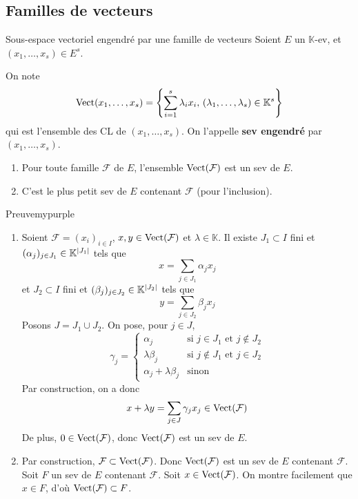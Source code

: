\subsection{Familles de vecteurs}

    \begin{defitheo}{Sous-espace vectoriel engendré par une famille de vecteurs}{}
        Soient $E$ un $\mathbb{K}$-ev, et $(x_1,\ldots,x_s) \in E^s$.

        On note 
        \[ \operatorname{Vect}(x_1,\ldots,x_s) = \left\{ \sum\limits_{i=1}^s \lambda_i x_i, \, (\lambda_1,\ldots,\lambda_s) \in \mathbb{K}^s \right\} \] 
        qui est l’ensemble des CL de $(x_1,\ldots,x_s)$. On l’appelle \textbf{sev engendré} par $(x_1,\ldots,x_s)$.

        \begin{enumerate}
            \item Pour toute famille $\mathcal{F}$ de $E$, l’ensemble $\operatorname{Vect}(\mathcal{F})$ est un sev de $E$.
            \item C’est le plus petit sev de $E$ contenant $\mathcal{F}$ (pour l’inclusion).
        \end{enumerate}
    \end{defitheo}

    \begin{demo}{Preuve}{mypurple}
        \begin{enumerate}
        \item Soient $\mathcal{F} = (x_i)_{i \in I}$, $x,y \in \operatorname{Vect}(\mathcal{F})$ et $\lambda \in \mathbb{K}$. Il existe $J_1 \subset I$ fini et $(\alpha_j)_{j \in J_1} \in \mathbb{K}^{\left\lvert J_1\right\rvert}$ tels que 
        \[ x = \sum_{j \in J_1} \alpha_j x_j \]
        et $J_2 \subset I$ fini et $(\beta_j)_{j \in J_2} \in \mathbb{K}^{\left\lvert J_2\right\rvert}$ tels que 
        \[ y = \sum_{j \in J_2} \beta_j x_j \]
        Posons $J = J_1 \cup J_2$. On pose, pour $j \in J$,
        \[ \gamma_j = \left\{ 
            \begin{array}{cl}
                \alpha_j & \text{si } j \in J_1 \text{ et } j \notin J_2 \\
                \lambda \beta_j & \text{si } j \notin J_1 \text{ et } j \in J_2 \\
                \alpha_j + \lambda \beta_j & \text{sinon}
            \end{array}
         \right. \]
        Par construction, on a donc 
        \[ x+ \lambda y = \sum_{j \in J} \gamma_j x_j \in \operatorname{Vect}(\mathcal{F}) \]
        De plus, $0 \in \operatorname{Vect}(\mathcal{F})$, donc $\operatorname{Vect}(\mathcal{F})$ est un sev de $E$.
        \item Par construction, $\mathcal{F} \subset \operatorname{Vect}(\mathcal{F})$. Donc $\operatorname{Vect}(\mathcal{F})$ est un sev de $E$ contenant $\mathcal{F}$. Soit $F$ un sev de $E$ contenant $\mathcal{F}$. Soit $x \in \operatorname{Vect}(\mathcal{F})$. On montre facilement que $x \in F$, d’où $\operatorname{Vect}(\mathcal{F}) \subset F$.
        \end{enumerate}
    \end{demo}

